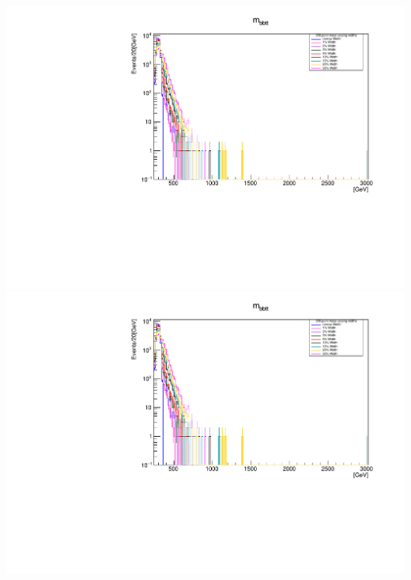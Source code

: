 \documentclass[a4wide,10pt]{article}
\begin{document}
\includegraphics[scale=0.50,page=19]{../Pdfs/Smeared_bbtt->X_Mass_VaryingWidths.pdf}
\includegraphics[scale=0.50,page=20]{../Pdfs/Smeared_bbtt->X_Mass_VaryingWidths.pdf}
\end{document}
